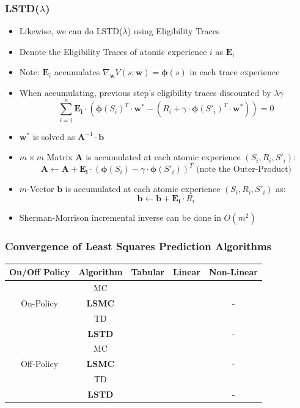 \documentclass[handout]{beamer}
\newcommand{\cmark}{\ding{51}}%
\newcommand{\xmark}{\ding{55}}%
\begin{document}
\begin{frame}
\frametitle{LSTD($\lambda$)}
\pause
\begin{itemize}[<+->]
\item Likewise, we can do LSTD($\lambda$) using Eligibility Traces
\item Denote the Eligibility Traces of atomic experience $i$ as $\bm{E}_i$
\item Note: $\bm{E}_i$ accumulates $\nabla_{\bm{w}} V(s;\bm{w}) = \bm{\phi}(s)$ in each trace experience
\item When accumulating, previous step's eligibility traces discounted by $\lambda \gamma$
$$\sum_{i=1}^n \bm{E_i} \cdot (\bm{\phi}(S_i)^T \cdot \bm{w^*} - (R_i + \gamma \cdot \bm{\phi}(S'_i)^T \cdot \bm{w}^*)) = 0$$
\item $\bm{w}^*$ is solved as $\bm{A}^{-1} \cdot \bm{b}$
\item $m \times m$ Matrix $\bm{A}$ is accumulated at each atomic experience $(S_i, R_i, S'_i)$:
$$ \bm{A} \leftarrow \bm{A} + \bm{E_i} \cdot (\bm{\phi}(S_i) - \gamma \cdot \bm{\phi}(S'_i))^T \text{ (note the Outer-Product)}$$
\item $m$-Vector $\bm{b}$ is accumulated at each atomic experience $(S_i, R_i, S'_i)$ as:
$$\bm{b} \leftarrow \bm{b} + \bm{E_i} \cdot R_i$$
\item Sherman-Morrison incremental inverse can be done in $O(m^2)$
\end{itemize}
\end{frame}

\begin{frame}
\frametitle{Convergence of Least Squares Prediction Algorithms}
\pause
\begin{center}
      \begin{tabular}{ccccc}
      \hline
      On/Off Policy & Algorithm & Tabular & Linear & Non-Linear \\ \hline
      \multirow{3}{*}{On-Policy} & MC & \cmark & \cmark & \cmark \\
      & {\bf LSMC} & \cmark & \cmark & - \\
      & TD & \cmark & \cmark & \xmark \\ 
      & {\bf LSTD} & \cmark & \cmark & - \\ \hline
      \multirow{3}{*}{Off-Policy} & MC & \cmark & \cmark & \cmark \\
      & {\bf LSMC} & \cmark & \xmark & - \\
      & TD & \cmark & \xmark & \xmark \\
      & {\bf LSTD} & \cmark & \xmark & - \\ \hline
      \end{tabular}
\end{center}      
\end{frame}
\end{document}
